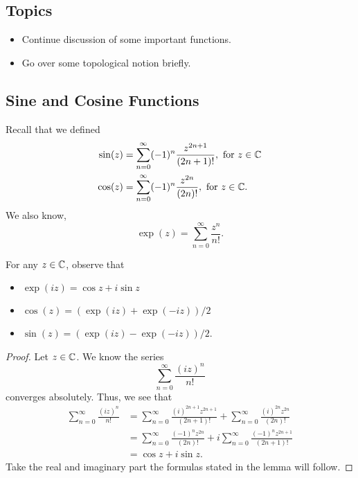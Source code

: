\documentclass[a4paper]{report}
\begin{document}
\subsection{Topics}
\begin{itemize}
    \item Continue discussion of some important functions.
    \item Go over some topological notion briefly.
\end{itemize}

\subsection{Sine and Cosine Functions}

Recall that we defined 
\begin{align*}
    \sin(z) &= \sum_{ n=0  }^{ \infty  } (-1)^{n} \frac{ z^{2n+1} }{ (2n+1)! } , \ \text{for} \ z \in \mathbb{C}  \\
    \cos(z) &= \sum_{ n = 0  }^{ \infty  } (-1)^{n} \frac{ z^{2n}  }{ (2n)! } , \ \text{for} \ z \in \mathbb{C}. 
\end{align*}
We also know,
\[  \exp(z) = \sum_{ n=0 }^{ \infty  } \frac{ z^{n} }{ n! }.  \]

\begin{lemma}
    For any \( z \in \mathbb{C}  \), observe that
    \begin{itemize}
        \item \( \exp(iz) = \cos z + i \sin z  \)
        \item \( \cos(z) = (\exp(iz) + \exp(-iz)) / 2 \) 
        \item \( \sin(z) = (\exp(iz) - \exp(-iz)) / 2 \).
    \end{itemize}
\end{lemma}

\begin{proof}
Let \( z \in \mathbb{C}  \). We know the series
\[  \sum_{ n=0 }^{ \infty  } \frac{ (iz)^{n} }{ n! }  \] converges absolutely.
Thus, we see that
\begin{align*}
    \sum_{ n=0 }^{ \infty  } \frac{ (iz)^{n} }{ n! } &= \sum_{ n=0 }^{ \infty  } \frac{ (i)^{2n+1} z^{2n+1} }{ (2n+1)! }  + \sum_{ n=0 }^{ \infty  } \frac{ (i)^{2n} z^{2n} }{ (2n)! }  \\
                                                     &= \sum_{ n=0 }^{ \infty  } \frac{ (-1)^{n} z^{2n} }{ (2n)! }  +  i  \sum_{ n=0 }^{ \infty  } \frac{ (-1)^{n} z^{2n+1} }{ (2n+1)! } \\
                                                     &= \cos z + i \sin z.
\end{align*}
Take the real and imaginary part the formulas stated in the lemma will follow.
\end{proof}
\end{document}
